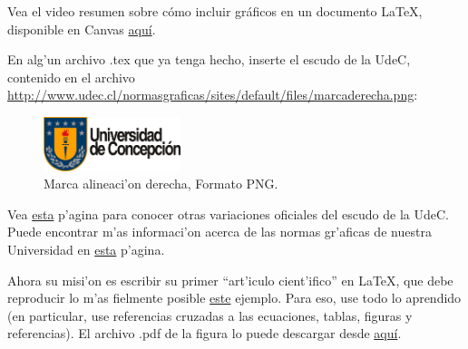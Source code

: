 \documentclass[11pt]{exam}
\begin{document}
\begin{questions}
\item Vea el video resumen sobre cómo incluir gráficos en un documento \LaTeX, disponible en Canvas \href{https://udec.instructure.com/courses/29314/pages/figuras?module_item_id=1039065}{aquí}.
\item En alg'un archivo .tex que ya tenga hecho, inserte el escudo de la UdeC, contenido en el archivo \url{http://www.udec.cl/normasgraficas/sites/default/files/marcaderecha.png}:
\begin{figure}[h!]
\begin{center}
\includegraphics[width=4cm]{marcaderecha.png}
\end{center}
\caption{Marca alineaci'on derecha, Formato PNG.}
\label{fig:escudo}
\end{figure}

Vea \href{http://www.udec.cl/normasgraficas/node/7}{esta} p'agina para conocer otras variaciones oficiales del escudo de la UdeC. 
Puede encontrar m'as informaci'on acerca de las normas gr'aficas de nuestra Universidad en \href{http://www.udec.cl/normasgraficas}{esta} p'agina.

\item Ahora su misi'on es escribir su primer ``art'iculo cient'ifico'' en \LaTeX, que debe reproducir lo m'as fielmente posible \href{https://github.com/gfrubi/CC/blob/master/guias/06/ejemplo-articulo.pdf}{este} ejemplo. Para eso, use todo lo aprendido (en particular, use referencias cruzadas a las ecuaciones, tablas, figuras y referencias). El archivo .pdf de la figura lo puede descargar desde \href{https://github.com/gfrubi/CC/blob/master/guias/06/fig-ajuste-lineal.pdf}{aqu\'i}.


\end{questions}
\end{document}
